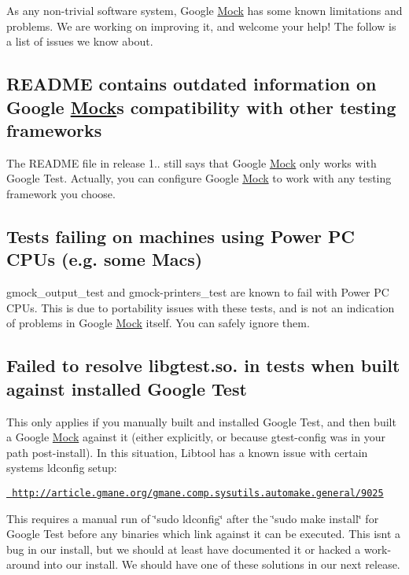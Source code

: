 As any non-\/trivial software system, Google \mbox{\hyperlink{class_mock}{Mock}} has some known limitations and problems. We are working on improving it, and welcome your help! The follow is a list of issues we know about.

\subsection*{R\+E\+A\+D\+ME contains outdated information on Google \mbox{\hyperlink{class_mock}{Mock}}\textquotesingle{}s compatibility with other testing frameworks}

The {\ttfamily R\+E\+A\+D\+ME} file in release 1.. still says that Google \mbox{\hyperlink{class_mock}{Mock}} only works with Google Test. Actually, you can configure Google \mbox{\hyperlink{class_mock}{Mock}} to work with any testing framework you choose.

\subsection*{Tests failing on machines using Power PC C\+P\+Us (e.\+g. some Macs)}

{\ttfamily gmock\+\_\+output\+\_\+test} and {\ttfamily gmock-\/printers\+\_\+test} are known to fail with Power PC C\+P\+Us. This is due to portability issues with these tests, and is not an indication of problems in Google \mbox{\hyperlink{class_mock}{Mock}} itself. You can safely ignore them.

\subsection*{Failed to resolve libgtest.\+so. in tests when built against installed Google Test}

This only applies if you manually built and installed Google Test, and then built a Google \mbox{\hyperlink{class_mock}{Mock}} against it (either explicitly, or because gtest-\/config was in your path post-\/install). In this situation, Libtool has a known issue with certain systems\textquotesingle{} ldconfig setup\+:

\href{http://article.gmane.org/gmane.comp.sysutils.automake.general/9025}\texttt{ http\+://article.\+gmane.\+org/gmane.\+comp.\+sysutils.\+automake.\+general/9025}

This requires a manual run of \char`\"{}sudo ldconfig\char`\"{} after the \char`\"{}sudo make install\char`\"{} for Google Test before any binaries which link against it can be executed. This isn\textquotesingle{}t a bug in our install, but we should at least have documented it or hacked a work-\/around into our install. We should have one of these solutions in our next release. 